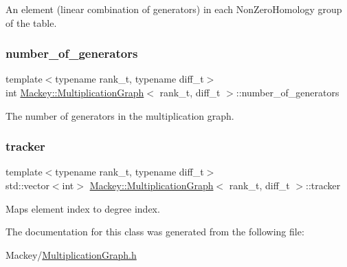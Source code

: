 An element (linear combination of generators) in each Non\+Zero\+Homology group of the table. 

\mbox{\label{classMackey_1_1MultiplicationGraph_a9fd088a706e8c2ffeae3db1584de9266}} 
\subsubsection{\texorpdfstring{number\+\_\+of\+\_\+generators}{number\_of\_generators}}
{\footnotesize\ttfamily template$<$typename rank\+\_\+t, typename diff\+\_\+t$>$ \\
int \hyperlink{classMackey_1_1MultiplicationGraph}{Mackey\+::\+Multiplication\+Graph}$<$ rank\+\_\+t, diff\+\_\+t $>$\+::number\+\_\+of\+\_\+generators}



The number of generators in the multiplication graph. 

\mbox{\label{classMackey_1_1MultiplicationGraph_ac831b81d1936c4dd2202dabaa8e4e2fb}} 
\subsubsection{\texorpdfstring{tracker}{tracker}}
{\footnotesize\ttfamily template$<$typename rank\+\_\+t, typename diff\+\_\+t$>$ \\
std\+::vector$<$int$>$ \hyperlink{classMackey_1_1MultiplicationGraph}{Mackey\+::\+Multiplication\+Graph}$<$ rank\+\_\+t, diff\+\_\+t $>$\+::tracker\hspace{0.3cm}{\ttfamily [protected]}}



Maps element index to degree index. 



The documentation for this class was generated from the following file\+:\begin{DoxyCompactItemize}
\item 
Mackey/\hyperlink{MultiplicationGraph_8h}{Multiplication\+Graph.\+h}\end{DoxyCompactItemize}
